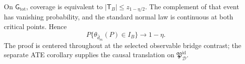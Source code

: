 On \(\mathsf G_{\mathrm{tot}}\), coverage is equivalent to \(|\mathsf T_B|\le z_{1-\eta/2}\).  The complement of that event has vanishing probability, and the standard normal law is continuous at both critical points.  Hence
\[
 P\{\theta_{\widehat d_m}(P)\in I_B\}\to1-\eta.
\]
The proof is centered throughout at the selected observable bridge contrast; the separate ATE corollary supplies the causal translation on \(\mathfrak P_{\mathcal D}^{\mathrm{id}}\).